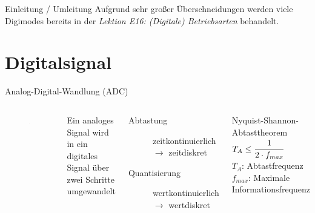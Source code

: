 

\subtitle{Technik A15: \\
Übertragungstechnik \\[2em]}
\date{Stand 06.03.2017}


\begin{frame}{Einleitung / Umleitung}
  Aufgrund sehr großer Überschneidungen werden viele Digimodes bereits in der \emph{Lektion E16: (Digitale) Betriebsarten} behandelt.
\end{frame}

\section{Digitalsignal}
\begin{frame}{Analog-Digital-Wandlung (ADC)}
  \begin{columns}
    \begin{figure}
      \includegraphics[width=\textwidth,height=.8\textheight,keepaspectratio]{a15/Uebersicht_kontinuierliche_und_diskrete_Signale.png}
    \end{figure}
    Ein analoges Signal wird in ein digitales Signal über zwei Schritte umgewandelt
    \begin{description}
      \item[Abtastung] zeitkontinuierlich $\rightarrow$ zeitdiskret
      \item[Quantisierung] wertkontinuierlich $\rightarrow$ wertdiskret
    \end{description}
    \begin{block}{Nyquist-Shannon-Abtasttheorem}
      $T_A \leq \cfrac{1}{2 \cdot f_{max}}$\\[.5em]
      $T_A$: Abtastfrequenz\\
      $f_{max}$: Maximale Informationsfrequenz
    \end{block}
  \end{columns}
\end{frame}

